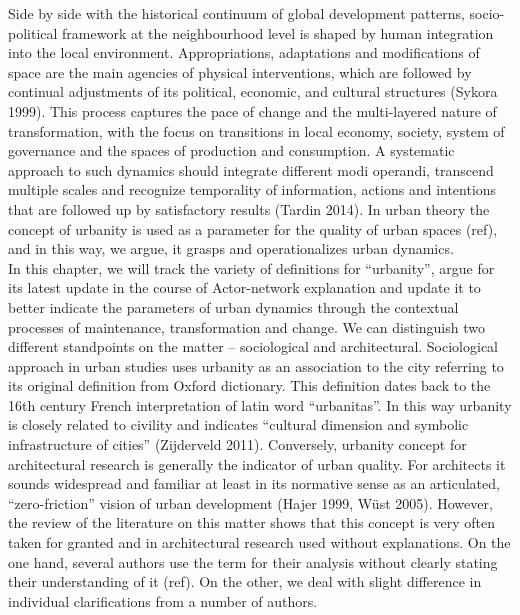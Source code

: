 \documentclass[11pt]{report}
\begin{document}
Side by side with the historical continuum of global development patterns, socio-political framework at the neighbourhood level is shaped by human integration into the local environment. Appropriations, adaptations and modifications of space are the main agencies of physical interventions, which are followed by continual adjustments of its political, economic, and cultural structures (Sykora 1999). This process captures the pace of change and the multi-layered nature of transformation, with the focus on transitions in local economy, society, system of governance and the spaces of production and consumption. A systematic approach to such dynamics should integrate different modi operandi, transcend multiple scales and recognize temporality of information, actions and intentions that are followed up by satisfactory results (Tardin 2014). In urban theory the concept of urbanity is used as a parameter for the quality of urban spaces (ref), and in this way, we argue, it grasps and operationalizes urban dynamics.
\\
In this chapter, we will track the variety of definitions for “urbanity”, argue for its latest update in the course of Actor-network explanation and update it to better indicate the parameters of urban dynamics through the contextual processes of maintenance, transformation and change. We can distinguish two different standpoints on the matter – sociological and architectural. Sociological approach in urban studies uses urbanity as an association to the city referring to its original definition from Oxford dictionary. This definition dates back to the 16th century French interpretation of latin word “urbanitas”. In this way urbanity is closely related to civility  and indicates “cultural dimension and symbolic infrastructure of cities” (Zijderveld 2011). Conversely, urbanity concept for architectural research is generally the indicator of urban quality. For architects it sounds widespread and familiar at least in its normative sense as an articulated, “zero-friction” vision of urban development (Hajer 1999, Wüst 2005). However, the review of the literature on this matter shows that this concept is very often taken for granted and in architectural research used without explanations. On the one hand, several authors use the term for their analysis without clearly stating their understanding of it (ref). On the other, we deal with slight difference in individual clarifications from a number of authors.
\\
\end{document}
